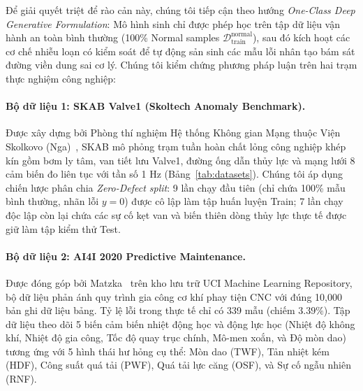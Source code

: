 \documentclass{article}
\begin{document}
Để giải quyết triệt để rào cản này, chúng tôi tiếp cận theo hướng \emph{One-Class Deep Generative Formulation}: Mô hình sinh chỉ được phép học trên tập dữ liệu vận hành an toàn bình thường (100\% Normal samples $\mathcal{D}_{\text{train}}^{\text{normal}}$), sau đó kích hoạt các cơ chế nhiễu loạn có kiểm soát để tự động sản sinh các mẫu lỗi nhân tạo bám sát đường viền dung sai cơ lý. Chúng tôi kiểm chứng phương pháp luận trên hai trạm thực nghiệm công nghiệp:

\paragraph{Bộ dữ liệu 1: SKAB Valve1 (Skoltech Anomaly Benchmark).} Được xây dựng bởi Phòng thí nghiệm Hệ thống Không gian Mạng thuộc Viện Skolkovo (Nga)~\citep{katser2021skab}, SKAB mô phỏng trạm tuần hoàn chất lỏng công nghiệp khép kín gồm bơm ly tâm, van tiết lưu Valve1, đường ống dẫn thủy lực và mạng lưới 8 cảm biến đo liên tục với tần số 1 Hz (Bảng~\ref{tab:datasets}). Chúng tôi áp dụng chiến lược phân chia \emph{Zero-Defect split}: 9 lần chạy đầu tiên (chỉ chứa 100\% mẫu bình thường, nhãn lỗi $y=0$) được cô lập làm tập huấn luyện Train; 7 lần chạy độc lập còn lại chứa các sự cố kẹt van và biến thiên dòng thủy lực thực tế được giữ làm tập kiểm thử Test.

\paragraph{Bộ dữ liệu 2: AI4I 2020 Predictive Maintenance.} Được đóng góp bởi Matzka~\citep{matzka2020explainable} trên kho lưu trữ UCI Machine Learning Repository, bộ dữ liệu phản ánh quy trình gia công cơ khí phay tiện CNC với đúng 10,000 bản ghi dữ liệu bảng. Tỷ lệ lỗi trong thực tế chỉ có 339 mẫu (chiếm $3.39\%$). Tập dữ liệu theo dõi 5 biến cảm biến nhiệt động học và động lực học (Nhiệt độ không khí, Nhiệt độ gia công, Tốc độ quay trục chính, Mô-men xoắn, và Độ mòn dao) tương ứng với 5 hình thái hư hỏng cụ thể: Mòn dao (TWF), Tản nhiệt kém (HDF), Công suất quá tải (PWF), Quá tải lực căng (OSF), và Sự cố ngẫu nhiên (RNF).
\end{document}
